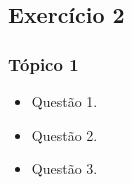 \subsection[Exercício 2]{Exercício 2}\label{subsec:exercicio-2}



\begin{frame}[t]\frametitle{Tópico 1}

\begin{itemize}
  \justifying{}
  \setlength\itemsep{1em}
  \item Questão 1.
  \item Questão 2.
  \item Questão 3.
\end{itemize}

\end{frame}
